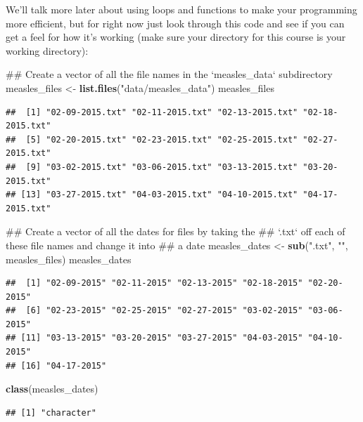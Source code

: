 \documentclass[]{book}
\makeatletter
\newenvironment{Shaded}{\begin{snugshade}}{\end{snugshade}}
\newcommand{\KeywordTok}[1]{\textcolor[rgb]{0.13,0.29,0.53}{\textbf{#1}}}
\newcommand{\StringTok}[1]{\textcolor[rgb]{0.31,0.60,0.02}{#1}}
\newcommand{\NormalTok}[1]{#1}
\newenvironment{kframe}{%
\medskip{}
\setlength{\fboxsep}{.8em}
 \def\at@end@of@kframe{}%
 \ifinner\ifhmode%
  \def\at@end@of@kframe{\end{minipage}}%
  \begin{minipage}{\columnwidth}%
 \fi\fi%
 \def\FrameCommand##1{\hskip\@totalleftmargin \hskip-\fboxsep
 \colorbox{shadecolor}{##1}\hskip-\fboxsep
     \hskip-\linewidth \hskip-\@totalleftmargin \hskip\columnwidth}%
 \MakeFramed {\advance\hsize-\width
   \@totalleftmargin\z@ \linewidth\hsize
   \@setminipage}}%
 {\par\unskip\endMakeFramed%
 \at@end@of@kframe}
\renewenvironment{Shaded}{\begin{kframe}}{\end{kframe}}
\theoremstyle{definition}
\theoremstyle{definition}
\theoremstyle{definition}
\theoremstyle{remark}
\makeatother
\begin{document}
We'll talk more later about using loops and functions to make your
programming more efficient, but for right now just look through this
code and see if you can get a feel for how it's working (make sure your
directory for this course is your working directory):

\begin{Shaded}
\begin{Highlighting}[]
\NormalTok{## Create a vector of all the file names in the `measles_data` subdirectory}
\NormalTok{measles_files <-}\StringTok{ }\KeywordTok{list.files}\NormalTok{(}\StringTok{"data/measles_data"}\NormalTok{)}
\NormalTok{measles_files}
\end{Highlighting}
\end{Shaded}

\begin{verbatim}
##  [1] "02-09-2015.txt" "02-11-2015.txt" "02-13-2015.txt" "02-18-2015.txt"
##  [5] "02-20-2015.txt" "02-23-2015.txt" "02-25-2015.txt" "02-27-2015.txt"
##  [9] "03-02-2015.txt" "03-06-2015.txt" "03-13-2015.txt" "03-20-2015.txt"
## [13] "03-27-2015.txt" "04-03-2015.txt" "04-10-2015.txt" "04-17-2015.txt"
\end{verbatim}

\begin{Shaded}
\begin{Highlighting}[]
\NormalTok{## Create a vector of all the dates for files by taking the }
\NormalTok{## `.txt` off each of these file names and change it into}
\NormalTok{## a date}
\NormalTok{measles_dates <-}\StringTok{ }\KeywordTok{sub}\NormalTok{(}\StringTok{".txt"}\NormalTok{, }\StringTok{""}\NormalTok{, measles_files)}
\NormalTok{measles_dates}
\end{Highlighting}
\end{Shaded}

\begin{verbatim}
##  [1] "02-09-2015" "02-11-2015" "02-13-2015" "02-18-2015" "02-20-2015"
##  [6] "02-23-2015" "02-25-2015" "02-27-2015" "03-02-2015" "03-06-2015"
## [11] "03-13-2015" "03-20-2015" "03-27-2015" "04-03-2015" "04-10-2015"
## [16] "04-17-2015"
\end{verbatim}

\begin{Shaded}
\begin{Highlighting}[]
\KeywordTok{class}\NormalTok{(measles_dates)}
\end{Highlighting}
\end{Shaded}

\begin{verbatim}
## [1] "character"
\end{verbatim}
\end{document}
